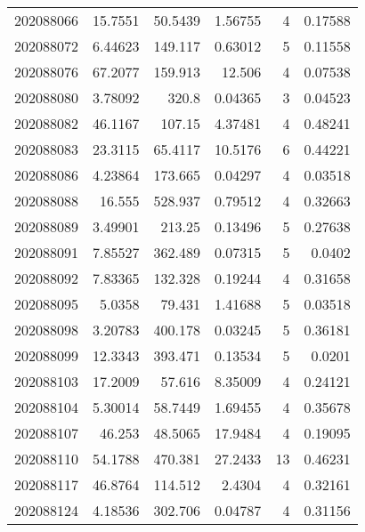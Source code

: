 \begin{tabular}{rrrrrr}
 202088066 &         15.7551  &       50.5439 &            1.56755 &           4 & 0.17588 \\
 202088072 &          6.44623 &      149.117  &            0.63012 &           5 & 0.11558 \\
 202088076 &         67.2077  &      159.913  &           12.506   &           4 & 0.07538 \\
 202088080 &          3.78092 &      320.8    &            0.04365 &           3 & 0.04523 \\
 202088082 &         46.1167  &      107.15   &            4.37481 &           4 & 0.48241 \\
 202088083 &         23.3115  &       65.4117 &           10.5176  &           6 & 0.44221 \\
 202088086 &          4.23864 &      173.665  &            0.04297 &           4 & 0.03518 \\
 202088088 &         16.555   &      528.937  &            0.79512 &           4 & 0.32663 \\
 202088089 &          3.49901 &      213.25   &            0.13496 &           5 & 0.27638 \\
 202088091 &          7.85527 &      362.489  &            0.07315 &           5 & 0.0402  \\
 202088092 &          7.83365 &      132.328  &            0.19244 &           4 & 0.31658 \\
 202088095 &          5.0358  &       79.431  &            1.41688 &           5 & 0.03518 \\
 202088098 &          3.20783 &      400.178  &            0.03245 &           5 & 0.36181 \\
 202088099 &         12.3343  &      393.471  &            0.13534 &           5 & 0.0201  \\
 202088103 &         17.2009  &       57.616  &            8.35009 &           4 & 0.24121 \\
 202088104 &          5.30014 &       58.7449 &            1.69455 &           4 & 0.35678 \\
 202088107 &         46.253   &       48.5065 &           17.9484  &           4 & 0.19095 \\
 202088110 &         54.1788  &      470.381  &           27.2433  &          13 & 0.46231 \\
 202088117 &         46.8764  &      114.512  &            2.4304  &           4 & 0.32161 \\
 202088124 &          4.18536 &      302.706  &            0.04787 &           4 & 0.31156 \\

\end{tabular}
